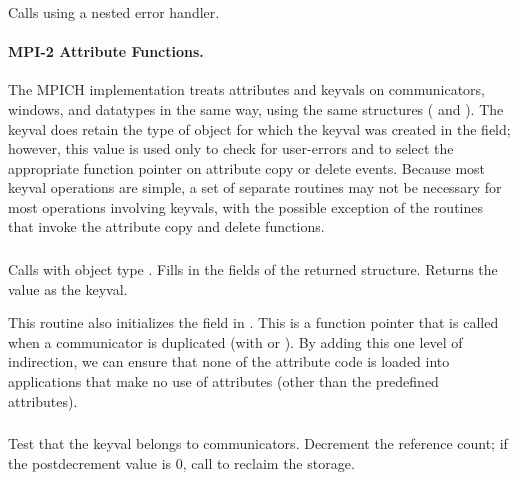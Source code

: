 \documentclass{article}
\begin{document}
\subsubsection{}
Calls  using a nested error handler.

\paragraph{MPI-2 Attribute Functions.}
The MPICH implementation treats attributes and keyvals on
communicators, windows, 
and datatypes in the same way, using the same structures
( and
).  The
keyval does retain the type of object for 
which the keyval was created in the  field;
however, this value is used only to check for user-errors and to select
the appropriate function pointer on attribute copy or delete events.  
Because most keyval operations are simple, a set of separate routines
may not be necessary for most operations involving keyvals, with the
possible exception of the
routines that invoke the attribute copy and delete functions.

\subsubsection{}
Calls  with object type
.  Fills in the fields of the returned
 structure.  Returns the 
value as the keyval.

This routine also initializes the 
field in .  This is a function pointer that is
called when a communicator is duplicated (with  or
).  By adding this one level of indirection, we can
ensure that none of the attribute code is loaded into applications
that make no use of attributes (other than the predefined attributes).



\subsubsection{}
Test that the keyval belongs to communicators.  Decrement the
reference count; if the postdecrement value is 0, call
 to reclaim the storage.
\end{document}
